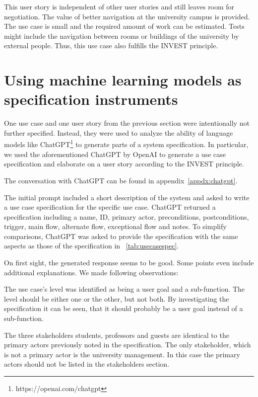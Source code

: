 \documentclass[conference,onecolumn]{IEEEtran}
\begin{document}
This user story is independent of other user stories and still leaves room for negotiation. The value of better navigation at the university campus is provided.
The use case is small and the required amount of work can be estimated. Tests might include the navigation between rooms or buildings of the university by external people.
Thus, this use case also fulfills the INVEST principle.

\section{Using machine learning models as specification instruments} \label{sec:chatgpt}

One use case and one user story from the previous section were intentionally not further specified. Instead, they were used to analyze the ability of language models like ChatGPT\footnote{https://openai.com/chatgpt} to generate parts of a system specification.
In particular, we used the aforementioned ChatGPT by OpenAI to generate a use case specification and elaborate on a user story according to the INVEST principle.

The conversation with ChatGPT can be found in appendix~\ref{appdx:chatgpt}.


The initial prompt included a short description of the system and asked to write a use case specification for the specific use case.
ChatGPT returned a specification including a name, ID, primary actor, preconditions, postconditions, trigger, main flow, alternate flow, exceptional flow and notes.
To simplify comparisons, ChatGPT was asked to provide the specification with the same aspects as those of the specification in \tablename~\ref{tab:usecasespec}.

On first sight, the generated response seems to be good. Some points even include additional explanations. We made following observations:

The use case's level was identified as being a user goal and a sub-function. The level should be either one or the other, but not both. By investigating the specification it can be seen, that it should probably be a user goal instead of a sub-function.

The three stakeholders students, professors and guests are identical to the primary actors previously noted in the specification. The only stakeholder, which is not a primary actor is the university management. In this case the primary actors should not be listed in the stakeholders section.
\end{document}
